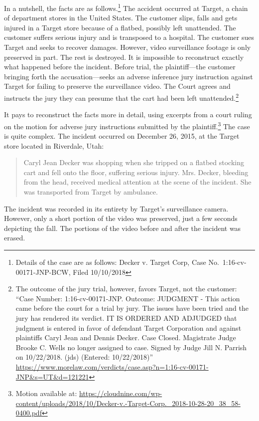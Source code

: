 \documentclass[
  10pt,
  dvipsnames,enabledeprecatedfontcommands]{scrartcl}
\begin{document}
In a nutshell, the facts are as follows.\footnote{Details of the case
  are as follows: Decker v. Target Corp, Case No.~1:16-cv-00171-JNP-BCW,
  Filed 10/10/2018} The accident occurred at Target, a chain of
department stores in the United States. The customer slips, falls and
gets injured in a Target store because of a flatbed, possibly left
unattended. The customer suffers serious injury and is transposed to a
hospital. The customer sues Target and seeks to recover damages.
However, video surveillance footage is only preserved in part. The rest
is destroyed. It is impossible to reconstruct exactly what happened
before the incident. Before trial, the plaintiff---the customer bringing
forth the accusation---seeks an adverse inference jury instruction
against Target for failing to preserve the surveillance video. The Court
agrees and instructs the jury they can presume that the cart had been
left unattended.\footnote{The outcome of the jury trial, however, favors
  Target, not the customer: ``Case Number: 1:16-cv-00171-JNP. Outcome:
  JUDGMENT - This action came before the court for a trial by jury. The
  issues have been tried and the jury has rendered its verdict. IT IS
  ORDERED AND ADJUDGED that judgment is entered in favor of defendant
  Target Corporation and against plaintiffs Caryl Jean and Dennis
  Decker. Case Closed. Magistrate Judge Brooke C. Wells no longer
  assigned to case. Signed by Judge Jill N. Parrish on 10/22/2018. (jds)
  (Entered: 10/22/2018)''
  \url{https://www.morelaw.com/verdicts/case.asp?n=1:16-cv-00171-JNP\&s=UT\&d=121221}}

It pays to reconstruct the facts more in detail, using excerpts from a
court ruling on the motion for adverse jury instructions submitted by
the plaintiff.\footnote{Motion available at:
  \url{https://cloudnine.com/wp-content/uploads/2018/10/Decker-v.-Target-Corp._2018-10-28-20_38_58-0400.pdf}}
The case is quite complex. The incident occurred on December 26, 2015,
at the Target store located in Riverdale, Utah:

\begin{quote}
Caryl Jean Decker was shopping when she tripped on a flatbed stocking cart and
fell onto the floor, suffering serious injury. Mrs. Decker, bleeding from the head, received medical attention at the scene of the incident. She was transported from Target by ambulance.
\end{quote}

\noindent The incident was recorded in its entirety by Target's
surveillance camera. However, only a short portion of the video was
preserved, just a few seconds depicting the fall. The portions of the
video before and after the incident was erased.
\end{document}
